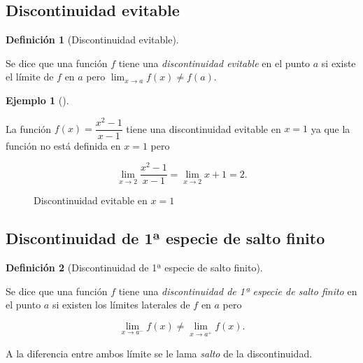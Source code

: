 \documentclass[
  a4paper,
]{scrreport}
\theoremstyle{definition}
\newtheorem{example}{Ejemplo}[chapter]
\theoremstyle{plain}
\theoremstyle{definition}
\newtheorem{definition}{Definición}[chapter]
\theoremstyle{definition}
\theoremstyle{plain}
\theoremstyle{plain}
\theoremstyle{remark}
\begin{document}
\subsection{Discontinuidad evitable}\label{discontinuidad-evitable}

\begin{definition}[Discontinuidad
evitable]\protect\hypertarget{def-discontinuiada-evitable}{}\label{def-discontinuiada-evitable}

Se dice que una función \(f\) tiene una \emph{discontinuidad evitable}
en el punto \(a\) si existe el límite de \(f\) en \(a\) pero
\(\displaystyle \lim_{x\to a}f(x)\neq f(a)\).

\end{definition}

\begin{example}[]\protect\hypertarget{exm-discontinuiada-evitable}{}\label{exm-discontinuiada-evitable}

La función \(f(x)=\dfrac{x^2-1}{x-1}\) tiene una discontinuidad evitable
en \(x=1\) ya que la función no está definida en \(x=1\) pero

\[\lim_{x\to 2}\frac{x^2-1}{x-1} = \lim_{x\to 2}x+1=2.\]

\begin{figure}
\centering

\caption{Discontinuidad evitable en \(x=1\)}
\end{figure}

\end{example}

\subsection{Discontinuidad de 1ª especie de salto
finito}\label{discontinuidad-de-1uxaa-especie-de-salto-finito}

\begin{definition}[Discontinuidad de 1ª especie de salto
finito]\protect\hypertarget{def-discontinuidad-1-especie-salto-finito}{}\label{def-discontinuidad-1-especie-salto-finito}

Se dice que una función \(f\) tiene una \emph{discontinuidad de 1ª
especie de salto finito} en el punto \(a\) si existen los límites
laterales de \(f\) en \(a\) pero

\[\lim_{x\to a^-}f(x)\neq \lim_{x\to a^+}f(x).\]

A la diferencia entre ambos límite se le lama \emph{salto} de la
discontinuidad.

\end{definition}
\end{document}
